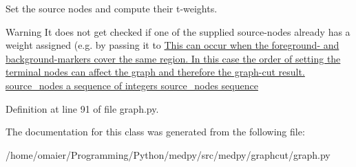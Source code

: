 Set the source nodes and compute their t-\/weights. 

\begin{DoxyWarning}{Warning}
It does not get checked if one of the supplied source-\/nodes already has a weight assigned (e.g. by passing it to \hyperlink{}{This can occur when the foreground-\/ and background-\/markers cover the same region. In this case the order of setting the terminal nodes can affect the graph and therefore the graph-\/cut result.   source\_\-nodes a sequence of integers  source\_\-nodes sequence }
\end{DoxyWarning}


Definition at line 91 of file graph.py.



The documentation for this class was generated from the following file:\begin{DoxyCompactItemize}
\item 
/home/omaier/Programming/Python/medpy/src/medpy/graphcut/graph.py\end{DoxyCompactItemize}
